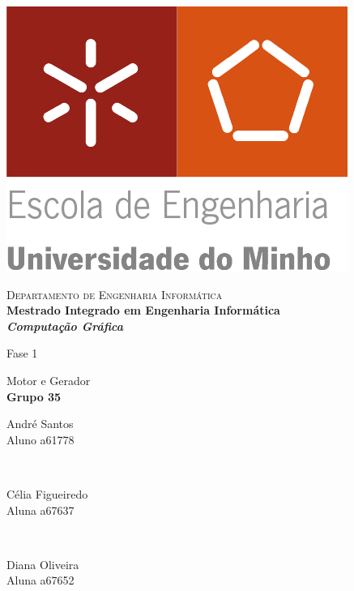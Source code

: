 \begin{titlepage}


\begin{minipage}{0.3\textwidth}
\begin{flushleft} 
\includegraphics[width=\textwidth]{./logo.png}
\end{flushleft}
\end{minipage}
\begin{minipage}{0.6\textwidth}
\begin{flushright} 

\textsc{Departamento de Engenharia Informática}\\[0.1cm]
\bfseries Mestrado Integrado em Engenharia Informática \\ [0.1cm]
\bfseries \textit{Computação Gráfica}\\[8mm]

\end{flushright}
\end{minipage}


\vspace{3cm}


\begin{center}


\LARGE Fase 1

\Large Motor e Gerador\\[1.5cm]


{\Large \bfseries Grupo 35\\[2cm] }


\begin{minipage}{0.4\textwidth}
		\large André Santos\\
           Aluno a61778
\end{minipage}
\\[1cm]
\begin{minipage}{0.4\textwidth}
		\large Célia Figueiredo\\
           Aluna a67637\\
\end{minipage}
\\[1cm]
\begin{minipage}{0.4\textwidth}
		\large Diana Oliveira\\
		Aluna a67652 
\end{minipage}


\end{center}
\end{titlepage}

